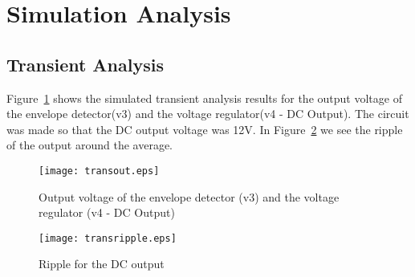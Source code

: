 \section{Simulation Analysis}
\label{sec:simulation}

\subsection{Transient Analysis}

Figure~\ref{fig:transout} shows the simulated transient analysis results for the output voltage of the envelope detector(v3) and the voltage regulator(v4 - DC Output). The circuit was made so that the DC output voltage was 12V. In Figure~\ref{fig:transripple} we see the ripple of the output around the average.


\begin{figure}[h] \centering
\texttt{[image: transout.eps]}
\caption{Output voltage of the envelope detector (v3) and the voltage regulator (v4 - DC Output)}
\label{fig:transout}
\end{figure}

\newpage

\begin{figure}[h] \centering
\texttt{[image: transripple.eps]}
\caption{Ripple for the DC output}
\label{fig:transripple}
\end{figure}
